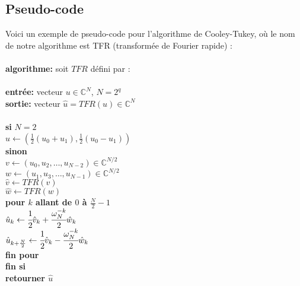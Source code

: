 \documentclass[12pt]{article}
\begin{document}
\subsection{Pseudo-code}
Voici un exemple de pseudo-code pour l'algorithme de Cooley-Tukey, où le nom de notre algorithme est TFR (transformée de Fourier rapide) :\\\\
\textbf{algorithme:} soit $TFR$ défini par :\\\\
\hspace*{1cm}\textbf{entrée:} vecteur $u\in\mathbb{C}^N$, $N=2^q$\\
\hspace*{1cm}\textbf{sortie:} vecteur $\hat{u}=TFR(u)\in\mathbb{C}^N$\\\\
\hspace*{1cm}\textbf{si} $N=2$\\
\hspace*{2cm} $\hat{u}\leftarrow(\frac{1}{2}(u_0+u_1),\frac{1}{2}(u_0-u_1))$\\
\hspace*{1cm}\textbf{sinon}\\
\hspace*{2cm}$v\leftarrow(u_0,u_2,\ldots,u_{N-2})\in\mathbb{C}^{N/2}$\\
\hspace*{2cm}$w\leftarrow(u_1,u_3,\ldots,u_{N-1})\in\mathbb{C}^{N/2}$\\
\hspace*{2cm}$\hat{v}\leftarrow TFR(v)$\\
\hspace*{2cm}$\hat{w}\leftarrow TFR(w)$\\
\hspace*{2cm}\textbf{pour $k$ allant de $0$ à $\frac{N}{2}-1$}\\
\hspace*{3cm}$\hat{u}_k\leftarrow\cfrac{1}{2}\hat{v}_k+\cfrac{\omega_N^{-k}}{2}\hat{w}_k$\\
\hspace*{3cm}$\hat{u}_{k+\frac{N}{2}}\leftarrow\cfrac{1}{2}\hat{v}_k-\cfrac{\omega_N^{-k}}{2}\hat{w}_k$\\
\hspace*{2cm}\textbf{fin pour}\\
\hspace*{1cm}\textbf{fin si}\\
\hspace*{1cm}\textbf{retourner $\hat{u}$}
\end{document}
